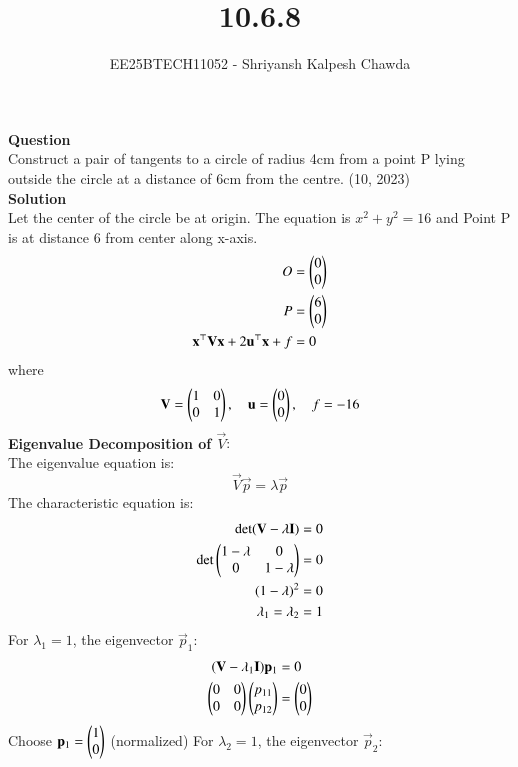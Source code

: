 \documentclass[article]{IEEEtran}
\begin{document}
	\title{10.6.8}
	\author{EE25BTECH11052 - Shriyansh Kalpesh Chawda}
	\maketitle
	\textbf{Question}\\
	Construct a pair of tangents to a circle of radius 4cm from a point P lying outside the circle at 
	a distance of 6cm from the centre.
	\hfill{(10, 2023)}\\
	\textbf{Solution}\\
	Let the center of the circle be at origin. The equation is $x^2 + y^2 = 16$ and Point P is at distance 6 from center along x-axis.
	\begin{align}
		O &= \begin{pmatrix}0\\0\end{pmatrix}\\
		P &= \begin{pmatrix}6\\0\end{pmatrix} \\
		\mathbf{x}^\top \mathbf{V} \mathbf{x} + 2\mathbf{u}^\top \mathbf{x} + f &= 0
	\end{align}
	where
	\begin{equation}
		\mathbf{V} = \begin{pmatrix}1 & 0\\0 & 1\end{pmatrix}, \quad \mathbf{u} = \begin{pmatrix}0\\0\end{pmatrix}, \quad f = -16
	\end{equation}
\textbf{Eigenvalue Decomposition of $\vec{V}$}:\\
	The eigenvalue equation is:
	\begin{equation}
		\vec{V}\vec{p} = \lambda\vec{p}
	\end{equation}
The characteristic equation is:
	\begin{align}
		\det(\mathbf{V} - \lambda\mathbf{I}) &= 0\\
		\det\begin{pmatrix}1-\lambda & 0\\0 & 1-\lambda\end{pmatrix} &= 0\\
		(1-\lambda)^2 &= 0\\
		\lambda_1 = \lambda_2 &= 1
	\end{align}
For $\lambda_1 = 1$, the eigenvector $\vec{p}_1$:
	\begin{align}
		(\mathbf{V} - \lambda_1\mathbf{I})\mathbf{p}_1 &= 0\\
		\begin{pmatrix}0 & 0\\0 & 0\end{pmatrix}\begin{pmatrix}p_{11}\\p_{12}\end{pmatrix} &= \begin{pmatrix}0\\0\end{pmatrix}
	\end{align}
Choose $\mathbf{p}_1 = \begin{pmatrix}1\\0\end{pmatrix}$ (normalized)
For $\lambda_2 = 1$, the eigenvector $\vec{p}_2$:
\end{document}
